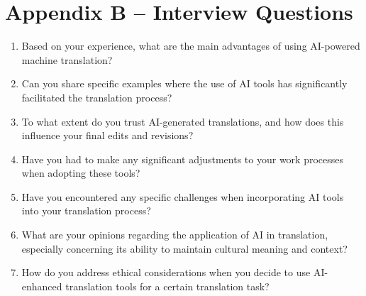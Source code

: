 \documentclass[english]{textolivre}
\begin{document}
\section*{Appendix B -- Interview Questions}

\begin{enumerate}

\item Based on your experience, what are the main advantages of using AI-powered machine translation?

\item Can you share specific examples where the use of AI tools has significantly facilitated the translation process?

\item To what extent do you trust AI-generated translations, and how does this influence your final edits and revisions?

\item Have you had to make any significant adjustments to your work processes when adopting these tools?

\item Have you encountered any specific challenges when incorporating AI tools into your translation process?

\item What are your opinions regarding the application of AI in translation, especially concerning its ability to maintain cultural meaning and context?

\item How do you address ethical considerations when you decide to use AI-enhanced translation tools for a certain translation task?

\end{enumerate}
\end{document}
